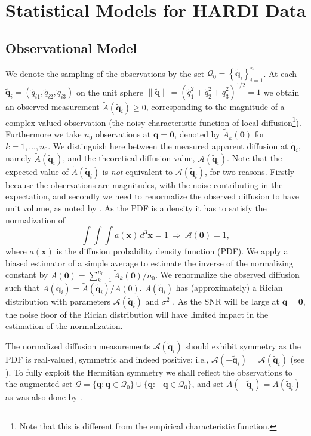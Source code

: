 \documentclass[dvips,aoas,preprint]{imsart}
\numberwithin{equation}{section}
\theoremstyle{plain}
\newcommand{\bq}{\mathbf{q}}
\newcommand{\q}{\mathbf{q}}
\newcommand{\tbq}{\tilde{\bq}}
\newcommand{\x}{\mathbf{x}}
\newcommand{\cA}{\mathcal{A}}
\newcommand{\cQ}{\mathcal{Q}}
\newcommand{\bld}[1]{\mathbf{#1}}
\newcommand{\wt}[1]{\widetilde{#1}}
\newcommand{\ol}[1]{\overline{#1}}
\begin{document}
\section{Statistical Models for HARDI Data}

\subsection{Observational Model}

We denote the sampling of the observations by the set
$\cQ_0=\left\{\tbq_i\right\}_{i=1}^n$.  At each
$\tbq_i=(\tilde{q}_{i1},\tilde{q}_{i2},\tilde{q}_{i3})$ on the unit
sphere
$\|\tbq\|=(\tilde{q}_{1}^2+\tilde{q}_{2}^2+\tilde{q}_{3}^2)^{1/2}=1$
we obtain an observed measurement $\wt{A}(\tbq_i)\ge0$, corresponding
to the magnitude of a complex-valued observation (the noisy characteristic function of local diffusion\footnote{Note that this is different from the empirical characteristic function.}).  Furthermore we take
$n_0$ observations at $\q=\bld{0}$, denoted by $\wt{A}_k(\bld{0})$ for
$k=1,\dots,n_0$.  We distinguish here between the measured apparent
diffusion at $\tbq_i$, namely $\wt{A}(\tbq_i)$, and the theoretical
diffusion value, $\cA(\tbq_i)$. Note that the expected value of
$\wt{A}(\tbq_i)$ is {\em not} equivalent to $\cA(\tbq_i)$, for two
reasons. Firstly because the observations are magnitudes, with the noise
contributing in the expectation, and secondly we need to renormalize
the observed diffusion to have unit volume, as noted by \citet{Alexander2005}. As the PDF
is a density it has to satisfy the normalization of
\begin{equation}
  \int \int \int a(\x) \, d^3\x = 1 ~ \Rightarrow ~ \cA(\bld{0}) = 1,
\end{equation}
where $a(\x)$ is the diffusion probability density function (PDF).  We
apply a biased estimator of a simple average to estimate the inverse
of the normalizing constant by
$\ol{A}(\bld{0})=\sum_{k=1}^{n_0}\wt{A}_k(\bld{0})/n_0$.  We
renormalize the observed diffusion such that
$A(\tbq_i)=\wt{A}(\tbq_i)/\ol{A}(0)$.  $A(\tbq_i)$ has (approximately)
a Rician distribution with parameters $\cA(\tbq_i)$ and $\sigma^2$ \citep{Gudbjartsson}.
As the SNR will be large at $\q=\bld{0}$, the noise floor of the
Rician distribution will have limited impact in the estimation of the
normalization.

The normalized diffusion measurements $\cA(\tbq_i)$ should exhibit
symmetry as the PDF is real-valued, symmetric and indeed positive;
i.e., $\cA(-\tbq_i)=\cA(\tbq_i)$ (see \citep{Wedeen05}).  To fully exploit the Hermitian
symmetry we shall reflect the observations to the augmented set
$\cQ=\{\q:\q\in\cQ_0\}\cup\{\q:-\q\in\cQ_0\}$, and set
$A(-\tbq_i)=A(\tbq_i)$ as was also done by \citet{Jansons}.  
\end{document}
